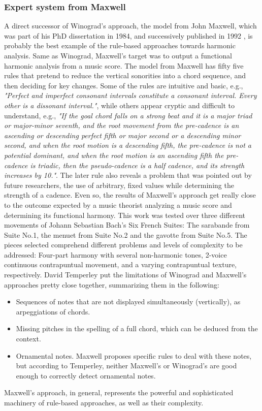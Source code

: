     \subsubsection{Expert system from Maxwell}
    A direct successor of Winograd's approach, the model from John Maxwell, which was part of his PhD dissertation in 1984, and successively published in 1992 \cite{maxwell1992expert}, is probably the best example of the rule-based approaches towards harmonic analysis. Same as Winograd, Maxwell's target was to output a functional harmonic analysis from a music score. The model from Maxwell has fifty five rules that pretend to reduce the vertical sonorities into a chord sequence, and then deciding for key changes. Some of the rules are intuitive and basic, e.g., \emph{"Perfect and imperfect consonant intervals constitute a consonant interval. Every other is a dissonant interval."}, while others appear cryptic and difficult to understand, e.g., \emph{"If the goal chord falls on a strong beat and it is a major triad or major-minor seventh, and the root movement from the pre-cadence is an ascending or descending perfect fifth or major second or a descending minor second, and when the root motion is a descending fifth, the pre-cadence is not a potential dominant, and when the root motion is an ascending fifth the pre-cadence is triadic, then the pseudo-cadence is a half cadence, and its strength increases by 10."}.
    The later rule also reveals a problem that was pointed out by future researchers, the use of arbitrary, fixed values while determining the strength of a cadence. Even so, the results of Maxwell's approach get really close to the outcome expected by a music theorist analyzing a music score and determining its functional harmony. This work was tested over three different movements of Johann Sebastian Bach's Six French Suites: The sarabande from Suite No.1, the menuet from Suite No.2 and the gavotte from Suite No.5. The pieces selected comprehend different problems and levels of complexity to be addressed: Four-part harmony with several non-harmonic tones, 2-voice continuous contrapuntual movement, and a varying contrapuntual texture, respectively. David Temperley put the limitations of Winograd and Maxwell's approaches pretty close together, summarizing them in the following:
		\begin{itemize}
			\item Sequences of notes that are not displayed simultaneously (vertically), as arpeggiations of chords.
			\item Missing pitches in the spelling of a full chord, which can be deduced from the context.
			\item Ornamental notes. Maxwell proposes specific rules to deal with these notes, but according to Temperley, neither Maxwell's or Winograd's are good enough to correctly detect ornamental notes.
    \end{itemize}
    Maxwell's approach, in general, represents the powerful and sophisticated machinery of rule-based approaches, as well as their complexity.
